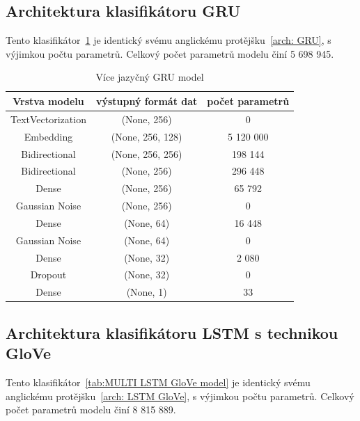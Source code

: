 \subsection{Architektura klasifikátoru GRU}
Tento klasifikátor~\ref{tab:MULTI GRU model} je identický svému anglickému protějšku~\ref{arch: GRU}, s výjimkou počtu parametrů.
Celkový počet parametrů modelu činí 5 698 945.

\begin{table}[H]
	\centering
	\caption{Více jazyčný GRU model}\label{tab:MULTI GRU model}
	\begin{tabular}{ c c c }
			\toprule
			Vrstva modelu & výstupný formát dat & počet parametrů\\
			\midrule
            TextVectorization & (None, 256) & 0\\         
            Embedding & (None, 256, 128) & 5 120 000\\   
            Bidirectional & (None, 256, 256) & 198 144\\    
            Bidirectional & (None, 256) & 296 448\\
			Dense & (None, 256) & 65 792\\ 
			Gaussian Noise & (None, 256) & 0\\
            Dense & (None, 64) & 16 448\\ 
			Gaussian Noise & (None, 64) & 0\\
			Dense & (None, 32) & 2 080\\ 
            Dropout & (None, 32) & 0\\   
            Dense & (None, 1) & 33\\ 
			\midrule
		\end{tabular}
\end{table}

\subsection{Architektura klasifikátoru LSTM s technikou GloVe}
Tento klasifikátor~\ref{tab:MULTI LSTM GloVe model} je identický svému anglickému protějšku~\ref{arch: LSTM GloVe}, s výjimkou počtu parametrů.
Celkový počet parametrů modelu činí 8 815 889.

